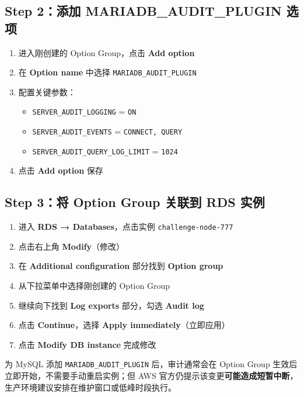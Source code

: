 \documentclass[12pt, a4paper]{article}
\begin{document}
\subsection{Step 2：添加 MARIADB\_AUDIT\_PLUGIN 选项}

\begin{enumerate}[leftmargin=2em]
  \item 进入刚创建的 Option Group，点击 \textbf{Add option}
  \item 在 \textbf{Option name} 中选择 \texttt{MARIADB\_AUDIT\_PLUGIN}
  \item 配置关键参数：
  \begin{itemize}
    \item \texttt{SERVER\_AUDIT\_LOGGING} = \texttt{ON}
    \item \texttt{SERVER\_AUDIT\_EVENTS} = \texttt{CONNECT, QUERY}
    \item \texttt{SERVER\_AUDIT\_QUERY\_LOG\_LIMIT} = \texttt{1024}
  \end{itemize}
  \item 点击 \textbf{Add option} 保存
\end{enumerate}

\subsection{Step 3：将 Option Group 关联到 RDS 实例}

\begin{enumerate}[leftmargin=2em]
  \item 进入 \textbf{RDS → Databases}，点击实例 \texttt{challenge-node-777}
  \item 点击右上角 \textbf{Modify}（修改）
  \item 在 \textbf{Additional configuration} 部分找到 \textbf{Option group}
  \item 从下拉菜单中选择刚创建的 Option Group
  \item 继续向下找到 \textbf{Log exports} 部分，勾选 \textbf{Audit log}
  \item 点击 \textbf{Continue}，选择 \textbf{Apply immediately}（立即应用）
  \item 点击 \textbf{Modify DB instance} 完成修改
\end{enumerate}

\begin{tcolorbox}[colback=warnbg, colframe=warnframe, title={\textbf{补充说明}}]
为 MySQL 添加 \texttt{MARIADB\_AUDIT\_PLUGIN} 后，审计通常会在 Option Group 生效后立即开始，不需要手动重启实例；但 AWS 官方仍提示该变更\textbf{可能造成短暂中断}，生产环境建议安排在维护窗口或低峰时段执行。
\end{tcolorbox}
\end{document}
